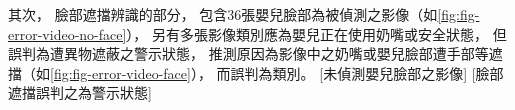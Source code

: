 \documentclass[class=NCU_thesis, crop=false]{standalone}
\begin{document}

其次，
臉部遮擋辨識的部分，
包含36張嬰兒臉部為被偵測之影像（如\cref{fig:fig-error-video-no-face}），
另有多張影像類別應為嬰兒正在使用奶嘴或安全狀態，
但誤判為遭異物遮蔽之警示狀態，
推測原因為影像中之奶嘴或嬰兒臉部遭手部等遮擋（如\cref{fig:fig-error-video-face}），
而誤判為類別。
[未偵測嬰兒臉部之影像]
[臉部遮擋誤判之為警示狀態]
\end{document}
